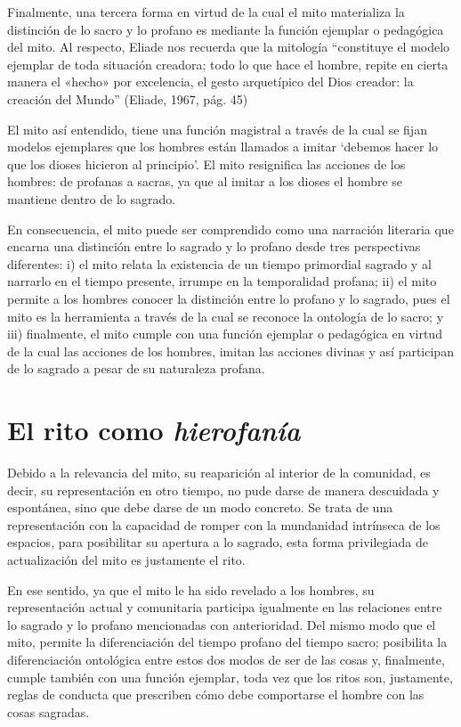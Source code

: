 \begin{refsection}
Finalmente, una tercera forma en virtud de la cual el mito materializa la distinción de lo sacro y lo profano es mediante la función ejemplar o pedagógica del mito. Al respecto, Eliade nos recuerda que la mitología ``constituye el modelo ejemplar de toda situación creadora; todo lo que hace el hombre, repite en cierta manera el «hecho» por excelencia, el gesto arquetípico del Dios creador: la creación del Mundo'' (Eliade, 1967, pág. 45)

El mito así entendido, tiene una función magistral a través de la cual se fijan modelos ejemplares que los hombres están llamados a imitar `debemos hacer lo que los dioses hicieron al principio'. El mito resignifica las acciones de los hombres: de profanas a sacras, ya que al imitar a los dioses el hombre se mantiene dentro de lo sagrado.

En consecuencia, el mito puede ser comprendido como una narración literaria que encarna una distinción entre lo sagrado y lo profano desde tres perspectivas diferentes: i) el mito relata la existencia de un tiempo primordial sagrado y al narrarlo en el tiempo presente, irrumpe en la temporalidad profana; ii) el mito permite a los hombres conocer la distinción entre lo profano y lo sagrado, pues el mito es la herramienta a través de la cual se reconoce la ontología de lo sacro; y iii) finalmente, el mito cumple con una función ejemplar o pedagógica en virtud de la cual las acciones de los hombres, imitan las acciones divinas y así participan de lo sagrado a pesar de su naturaleza profana.

\section{El rito como \emph{hierofanía} }

Debido a la relevancia del mito, su reaparición al interior de la comunidad, es decir, su representación en otro tiempo, no pude darse de manera descuidada y espontánea, sino que debe darse de un modo concreto. Se trata de una representación con la capacidad de romper con la mundanidad intrínseca de los espacios, para posibilitar su apertura a lo sagrado, esta forma privilegiada de actualización del mito es justamente el rito.

En ese sentido, ya que el mito le ha sido revelado a los hombres, su representación actual y comunitaria participa igualmente en las relaciones entre lo sagrado y lo profano mencionadas con anterioridad. Del mismo modo que el mito, permite la diferenciación del tiempo profano del tiempo sacro; posibilita la diferenciación ontológica entre estos dos modos de ser de las cosas y, finalmente, cumple también con una función ejemplar, toda vez que los ritos son, justamente, reglas de conducta que prescriben cómo debe comportarse el hombre con las cosas sagradas.


\end{refsection}
